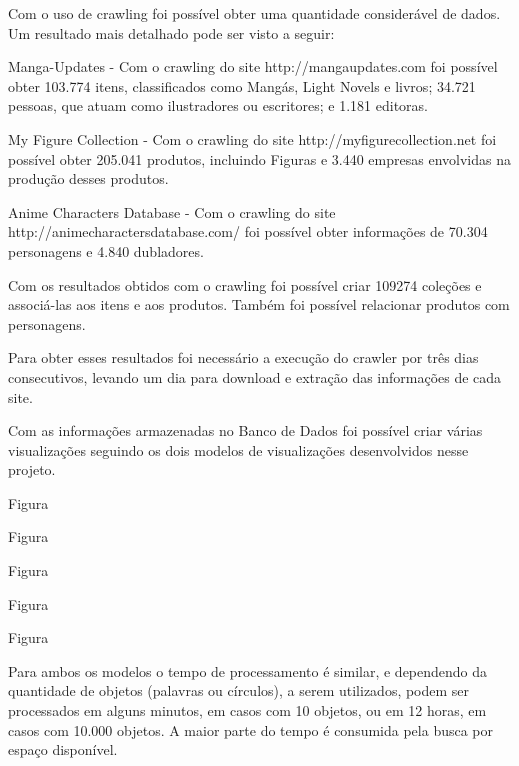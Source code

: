 \documentclass[12pt]{article}
\begin{document}
Com o uso de crawling foi possível obter uma quantidade considerável de dados. Um resultado mais detalhado pode ser visto a seguir: 

Manga-Updates - Com o crawling do site http://mangaupdates.com foi possível obter 103.774 itens, classificados como Mangás, Light Novels e livros; 34.721 pessoas, que atuam como ilustradores ou escritores; e 1.181 editoras.

My Figure Collection - Com o crawling do site http://myfigurecollection.net foi possível obter 205.041 produtos, incluindo Figuras e 3.440 empresas envolvidas na produção desses produtos.

Anime Characters Database - Com o crawling do site http://animecharactersdatabase.com/ foi possível obter informações de 70.304 personagens e 4.840 dubladores.

Com os resultados obtidos com o crawling foi possível criar 109274 coleções e associá-las aos itens e aos produtos. Também foi possível relacionar produtos com personagens.

Para obter esses resultados foi necessário a execução do crawler por três dias consecutivos, levando um dia para download e extração das informações de cada site.  

Com as informações armazenadas no Banco de Dados foi possível criar várias visualizações seguindo os dois modelos de visualizações desenvolvidos nesse projeto.




Figura


Figura


Figura


Figura


Figura



Para ambos os modelos o tempo de processamento é similar, e dependendo da quantidade de objetos (palavras ou círculos), a serem utilizados, podem ser processados em alguns minutos, em casos com 10 objetos, ou em 12 horas, em casos com 10.000 objetos. A maior parte do tempo é consumida pela busca por espaço disponível. 



\begin{thebibliography}{2}

\end{thebibliography}
\end{document}
